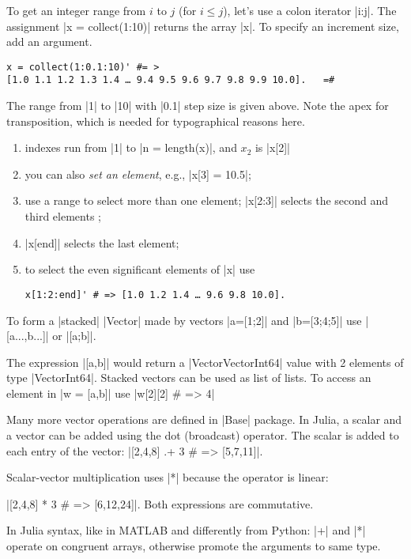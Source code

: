 To get an integer range from $i$ to $j$ (for $i\leq j$), let’s use a colon iterator |i:j|. The assignment |x = collect(1:10)| returns the array |x|. To specify an increment size, add an argument. 
\begin{lstlisting}[language=JuliaLocal, style=julia, mathescape=false]
x = collect(1:0.1:10)' #= > 
[1.0 1.1 1.2 1.3 1.4 … 9.4 9.5 9.6 9.7 9.8 9.9 10.0]. 	=#
\end{lstlisting}
The range from |1| to |10| with |0.1| step size is given above. 
Note the apex for transposition, which is needed for typographical reasons here.
\begin{enumerate} 
\item indexes run from |1| to |n = length(x)|, and $x_2$ is |x[2]|

\item you can also \emph{set an element}, e.g., |x[3] = 10.5|;

\item use a range to select more than one element;
  |x[2:3]| selects the second and third elements ;

\item |x[end]| selects the last element;

\item to select the even significant elements of |x| use 
\begin{lstlisting}[language=JuliaLocal, style=julia, mathescape=true]
x[1:2:end]' # => [1.0 1.2 1.4 … 9.6 9.8 10.0]. 
\end{lstlisting}


\end{enumerate}

To form a |stacked| |Vector| made by vectors |a=[1;2]| and |b=[3;4;5]| use |[a...,b...]| or |[a;b]|. 

The expression |[a,b]| would return a |Vector{Vector{Int64}}| value with 2 elements of type |Vector{Int64}|.  Stacked vectors can be used as list of lists. To access an element in |w = [a,b]| use |w[2][2] # => 4|

Many more vector operations are defined in |Base| package. In Julia, a scalar and a vector can be added using the dot (broadcast) operator. The scalar is added to each entry of the vector: |[2,4,8] .+ 3 # => [5,7,11]|. 

Scalar-vector multiplication uses |*|  
because the operator is linear: 

|[2,4,8] * 3 # => [6,12,24]|. Both expressions are commutative.

In Julia syntax, like in MATLAB and differently from Python: |+| and |*| operate on congruent arrays, otherwise promote the arguments to same type.


